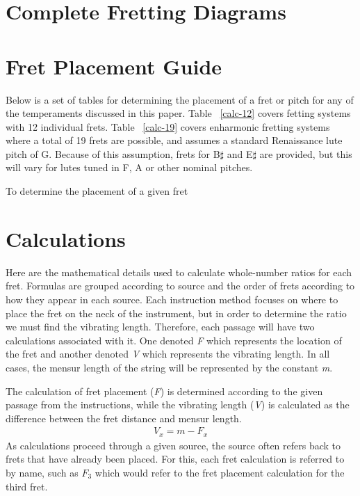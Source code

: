 \appendix

\chapter{Complete Fretting Diagrams}





\chapter{Fret Placement Guide}

Below is a set of tables for determining the placement of a fret or pitch for any of the 
temperaments discussed in this paper. Table ~\ref{calc-12} covers fetting systems with
12 individual frets.  Table ~\ref{calc-19} covers enharmonic fretting systems where
a total of 19 frets are possible, and assumes a standard Renaissance lute pitch of
G.  Because of this assumption, frets for B$\sharp$ and E$\sharp$ are provided, but
this will vary for lutes tuned in F, A or other nominal pitches.

To determine the placement of a given fret 





\chapter{Calculations}

Here are the mathematical details used to calculate whole-number ratios for each fret.
Formulas are grouped according to source and the order of frets according to how they
appear in each source.  Each instruction method focuses on where to place the fret on
the neck of the instrument, but in order to determine the ratio we must find the
vibrating length. Therefore, each passage will have two calculations associated with
it.  One denoted \textit{F} which represents the location of the fret and another
denoted \textit{V} which represents the vibrating length.  In all cases, the mensur
length of the string will be represented by the constant \textit{m}.

The calculation of fret placement (\textit{F}) is determined according to the given
passage from the instructions, while the vibrating length (\textit{V}) is calculated as
the difference between the fret distance and mensur length.
\begin{eqnarray*}
    V_x = m - F_x
\end{eqnarray*}
As calculations proceed through a given source, the source often refers back to frets
that have already been placed.  For this, each fret calculation is referred to by name,
such as $F_{3}$ which would refer to the fret placement calculation for the third fret.

